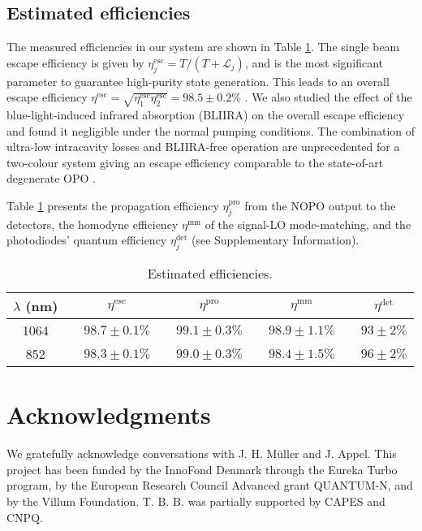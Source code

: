 \documentclass[final,twocolumn,english,prl,notitlepage,nofootinbib,floatfix,longbibliography,superscriptaddress
]{revtex4-2}
\begin{document}
\subsection*{Estimated efficiencies}
The measured efficiencies in our system are shown in Table \ref{tab:eff}. The single beam escape efficiency is given by $\eta_j^{\text{esc}} = T/(T+\mathcal{L}_j)$, and is the most significant parameter to guarantee high-purity state generation. This leads to an overall escape efficiency $\eta^\text{esc} =\sqrt{\eta_1^ {\text{esc}}\eta_2^{\text{esc}}} = 98.5\pm 0.2\%$ \cite{Schori2002}. We also studied the effect of the blue-light-induced infrared absorption (BLIIRA) \cite{Mabuchi1994} on the overall escape efficiency and found it negligible under the normal pumping conditions. The combination of ultra-low intracavity losses and BLIIRA-free operation are unprecedented for a two-colour system giving an escape efficiency comparable to the state-of-art degenerate OPO \cite{Eberle2013}.\par
Table \ref{tab:eff} presents the propagation efficiency $\eta_j^{\text{pro}}$ from the NOPO output to the detectors, the homodyne efficiency $\eta^\mathrm{mm}$ of the  signal-LO mode-matching, and the photodiodes' quantum efficiency $\eta^\mathrm{det}_j$ (see Supplementary Information).

\begin{table}[ht]
\caption{Estimated efficiencies.}
\label{tab:eff}
\begin{center}
\begin{tabular}{ c c c c c c c c c }
\hline
$\lambda$ (nm) & &$\eta^\mathrm{esc}$ & &$\eta^\mathrm{pro}$ & &$\eta^\mathrm{mm}$ & &$\eta^\mathrm{det}$\\ \hline
\parbox[c]{1cm}{1064} & & $98.7\pm 0.1\%$ & & $99.1\pm 0.3\%$ & & $98.9\pm 1.1\%$ & &$93 \pm 2 \%$\\
\parbox[c]{1cm}{852} & &$98.3\pm 0.1\%$ & & $99.0\pm 0.3\%$ &  & $98.4\pm 1.5\%$ & &$96 \pm 2\%$ \\
\hline
\end{tabular}
\end{center}
\end{table}

\section*{Acknowledgments}
We gratefully acknowledge conversations with J. H. Müller and J. Appel.  This project has been funded by the InnoFond Denmark through the Eureka Turbo program, by the European Research Council Advanced grant QUANTUM-N, and by the Villum Foundation. T. B. B. was partially supported by CAPES and CNPQ.
\end{document}
